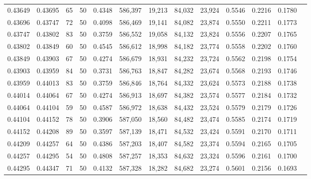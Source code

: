 \begin{tabular}{rrrrrrrrrrrrr}
0.43649 & 0.43695 &    65 &  50 &                                     0.4348 & 586,397 &  19,213 &  84,032 &  23,924 & 0.5546 & 0.2216 & 0.1780 \\
0.43696 & 0.43747 &    72 &  50 &                                     0.4098 & 586,469 &  19,141 &  84,082 &  23,874 & 0.5550 & 0.2211 & 0.1773 \\
0.43747 & 0.43802 &    83 &  50 &                                     0.3759 & 586,552 &  19,058 &  84,132 &  23,824 & 0.5556 & 0.2207 & 0.1765 \\
0.43802 & 0.43849 &    60 &  50 &                                     0.4545 & 586,612 &  18,998 &  84,182 &  23,774 & 0.5558 & 0.2202 & 0.1760 \\
0.43849 & 0.43903 &    67 &  50 &                                     0.4274 & 586,679 &  18,931 &  84,232 &  23,724 & 0.5562 & 0.2198 & 0.1754 \\
0.43903 & 0.43959 &    84 &  50 &                                     0.3731 & 586,763 &  18,847 &  84,282 &  23,674 & 0.5568 & 0.2193 & 0.1746 \\
0.43959 & 0.44013 &    83 &  50 &                                     0.3759 & 586,846 &  18,764 &  84,332 &  23,624 & 0.5573 & 0.2188 & 0.1738 \\
0.44014 & 0.44064 &    67 &  50 &                                     0.4274 & 586,913 &  18,697 &  84,382 &  23,574 & 0.5577 & 0.2184 & 0.1732 \\
0.44064 & 0.44104 &    59 &  50 &                                     0.4587 & 586,972 &  18,638 &  84,432 &  23,524 & 0.5579 & 0.2179 & 0.1726 \\
0.44104 & 0.44152 &    78 &  50 &                                     0.3906 & 587,050 &  18,560 &  84,482 &  23,474 & 0.5585 & 0.2174 & 0.1719 \\
0.44152 & 0.44208 &    89 &  50 &                                     0.3597 & 587,139 &  18,471 &  84,532 &  23,424 & 0.5591 & 0.2170 & 0.1711 \\
0.44209 & 0.44257 &    64 &  50 &                                     0.4386 & 587,203 &  18,407 &  84,582 &  23,374 & 0.5594 & 0.2165 & 0.1705 \\
0.44257 & 0.44295 &    54 &  50 &                                     0.4808 & 587,257 &  18,353 &  84,632 &  23,324 & 0.5596 & 0.2161 & 0.1700 \\
0.44295 & 0.44347 &    71 &  50 &                                     0.4132 & 587,328 &  18,282 &  84,682 &  23,274 & 0.5601 & 0.2156 & 0.1693 \\

\end{tabular}
